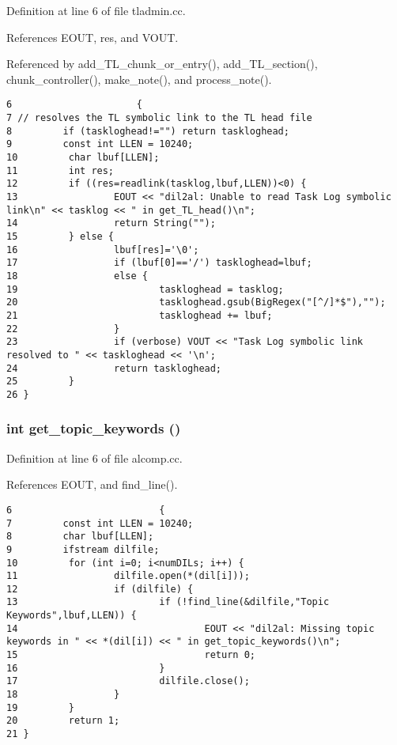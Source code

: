 Definition at line 6 of file tladmin.cc.

References EOUT, res, and VOUT.

Referenced by add\_\-TL\_\-chunk\_\-or\_\-entry(), add\_\-TL\_\-section(), chunk\_\-controller(), make\_\-note(), and process\_\-note().



\footnotesize\begin{verbatim}6                      {
7 // resolves the TL symbolic link to the TL head file
8         if (taskloghead!="") return taskloghead;
9         const int LLEN = 10240;
10         char lbuf[LLEN];
11         int res;
12         if ((res=readlink(tasklog,lbuf,LLEN))<0) {
13                 EOUT << "dil2al: Unable to read Task Log symbolic link\n" << tasklog << " in get_TL_head()\n";
14                 return String("");
15         } else {
16                 lbuf[res]='\0';
17                 if (lbuf[0]=='/') taskloghead=lbuf;
18                 else {
19                         taskloghead = tasklog;
20                         taskloghead.gsub(BigRegex("[^/]*$"),"");
21                         taskloghead += lbuf;
22                 }
23                 if (verbose) VOUT << "Task Log symbolic link resolved to " << taskloghead << '\n';
24                 return taskloghead;
25         }
26 }
\end{verbatim}\normalsize 
{}
\subsubsection{\setlength{\rightskip}{0pt plus 5cm}int get\_\-topic\_\-keywords ()}\label{dil2al_8hh_a282}




Definition at line 6 of file alcomp.cc.

References EOUT, and find\_\-line().



\footnotesize\begin{verbatim}6                          {
7         const int LLEN = 10240;
8         char lbuf[LLEN];
9         ifstream dilfile;
10         for (int i=0; i<numDILs; i++) {
11                 dilfile.open(*(dil[i]));
12                 if (dilfile) {
13                         if (!find_line(&dilfile,"Topic Keywords",lbuf,LLEN)) {
14                                 EOUT << "dil2al: Missing topic keywords in " << *(dil[i]) << " in get_topic_keywords()\n";
15                                 return 0;
16                         }
17                         dilfile.close();
18                 }
19         }
20         return 1;
21 }
\end{verbatim}\normalsize 
{}

